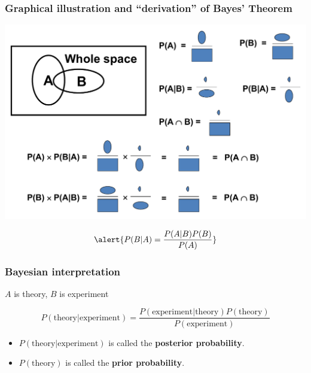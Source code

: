 \documentclass[9pt]{beamer}
\begin{document}
\begin{frame}
 \frametitle{Graphical illustration and ``derivation'' of Bayes' Theorem}
 \vspace{-5pt}
 
 \includegraphics[width=\textwidth]{BayesTheorem.png}
 
 \begin{large}$$\alert{P(B|A) = \frac{P(A|B) P(B)}{P(A)}}$$                                              \end{large}
\end{frame}

\begin{frame}
 \frametitle{Bayesian interpretation}
 
 $A$ is theory, $B$ is experiment
 
 $$P(\text{theory} | \text{experiment}) = \frac{P(\text{experiment}|\text{theory}) P(\text{theory})}{P(\text{experiment})}$$
 
 \begin{itemize}
  \item $P(\text{theory} | \text{experiment})$ is called the \textbf{posterior probability}.
  \item $P(\text{theory})$ is called the \textbf{prior probability}.
 \end{itemize}

\end{frame}
\end{document}

